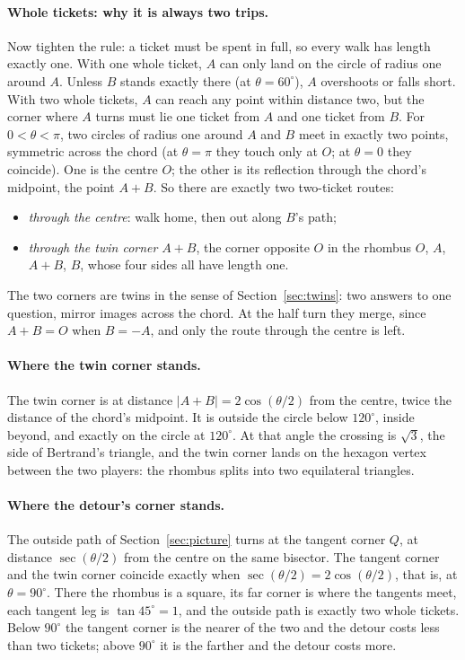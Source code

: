 \documentclass[11pt]{article}
\begin{document}
\paragraph{Whole tickets: why it is always two trips.} Now tighten the rule: a ticket
must be spent in full, so every walk has length exactly one. With one whole ticket, $A$
can only land on the circle of radius one around $A$. Unless $B$ stands exactly there
(at $\theta=60^\circ$), $A$ overshoots or falls short. With two whole tickets, $A$ can
reach any point within distance two, but the corner where $A$ turns must lie one ticket
from $A$ and one ticket from $B$. For $0<\theta<\pi$, two circles of radius one around $A$ and $B$ meet in
exactly two points, symmetric across the chord (at $\theta=\pi$ they touch only at $O$; at
$\theta=0$ they coincide). One is the centre $O$; the other is its
reflection through the chord's midpoint, the point $A+B$. So there are exactly two
two-ticket routes:
\begin{itemize}
  \item \emph{through the centre}: walk home, then out along $B$'s path;
  \item \emph{through the twin corner} $A+B$, the corner opposite $O$ in the rhombus
    $O$, $A$, $A+B$, $B$, whose four sides all have length one.
\end{itemize}
The two corners are twins in the sense of Section~\ref{sec:twins}: two answers to one
question, mirror images across the chord. At the half turn they merge, since $A+B=O$
when $B=-A$, and only the route through the centre is left.

\paragraph{Where the twin corner stands.} The twin corner is at distance
$|A+B|=2\cos(\theta/2)$ from the centre, twice the distance of the chord's midpoint. It
is outside the circle below $120^\circ$, inside beyond, and exactly on the circle at
$120^\circ$. At that angle the crossing is $\sqrt3$, the side of Bertrand's triangle, and
the twin corner lands on the hexagon vertex between the two players: the rhombus splits
into two equilateral triangles.

\paragraph{Where the detour's corner stands.} The outside path of Section~\ref{sec:picture}
turns at the tangent corner $Q$, at distance $\sec(\theta/2)$ from the centre on the same
bisector. The tangent corner and the twin corner coincide exactly when
$\sec(\theta/2)=2\cos(\theta/2)$, that is, at $\theta=90^\circ$. There the rhombus is a
square, its far corner is where the tangents meet, each tangent leg is $\tan45^\circ=1$,
and the outside path is exactly two whole tickets. Below $90^\circ$ the tangent corner is
the nearer of the two and the detour costs less than two tickets; above $90^\circ$ it is
the farther and the detour costs more.
\end{document}
